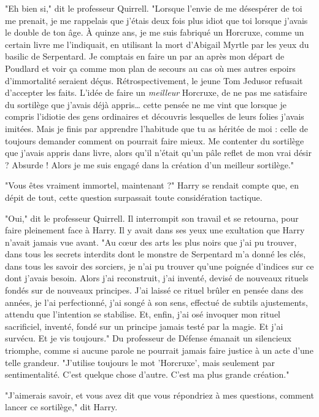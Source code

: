 "Eh bien si," dit le professeur Quirrell. "Lorsque l'envie de me désespérer de toi me prenait, je me rappelais que j'étais deux fois plus idiot que toi lorsque j'avais le double de ton âge. À quinze ans, je me suis fabriqué un Horcruxe, comme un certain livre me l'indiquait, en utilisant la mort d'Abigail Myrtle par les yeux du basilic de Serpentard. Je comptais en faire un par an après mon départ de Poudlard et voir ça comme mon plan de secours au cas où mes autres espoirs d'immortalité seraient déçus. Rétrospectivement, le jeune Tom Jedusor refusait d'accepter les faits. L'idée de faire un \emph{meilleur}  Horcruxe, de ne pas me satisfaire du sortilège que j'avais déjà appris… cette pensée ne me vint que lorsque je compris l'idiotie des gens ordinaires et découvris lesquelles de leurs folies j'avais imitées. Mais je finis par apprendre l'habitude que tu as héritée de moi : celle de toujours demander comment on pourrait faire mieux. Me contenter du sortilège que j'avais appris dans livre, alors qu'il n'était qu'un pâle reflet de mon vrai désir ? Absurde ! Alors je me suis engagé dans la création d'un meilleur sortilège."

"Vous êtes vraiment immortel, maintenant ?" Harry se rendait compte que, en dépit de tout, cette question surpassait toute considération tactique.

"Oui," dit le professeur Quirrell. Il interrompit son travail et se retourna, pour faire pleinement face à Harry. Il y avait dans ses yeux une exultation que Harry n'avait jamais vue avant. "Au cœur des arts les plus noirs que j'ai pu trouver, dans tous les secrets interdits dont le monstre de Serpentard m'a donné les clés, dans tous les savoir des sorciers, je n'ai pu trouver qu'une poignée d'indices sur ce dont j'avais besoin. Alors j'ai reconstruit, j'ai inventé, devisé de nouveaux rituels fondés sur de nouveaux principes. J'ai laissé ce rituel brûler en pensée dans des années, je l'ai perfectionné, j'ai songé à son sens, effectué de subtils ajustements, attendu que l'intention se stabilise. Et, enfin, j'ai osé invoquer mon rituel sacrificiel, inventé, fondé sur un principe jamais testé par la magie. Et j'ai survécu. Et je vis toujours." Du professeur de Défense émanait un silencieux triomphe, comme si aucune parole ne pourrait jamais faire justice à un acte d'une telle grandeur. "J'utilise toujours le mot 'Horcruxe', mais seulement par sentimentalité. C'est quelque chose d'autre. C'est ma plus grande création."

"J'aimerais savoir, et vous avez dit que vous répondriez à mes questions, comment lancer ce sortilège," dit Harry.

